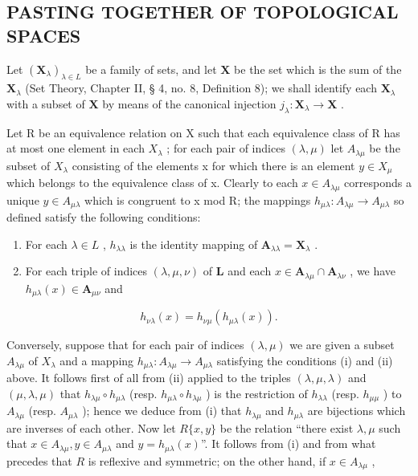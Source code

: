 \subsection{PASTING TOGETHER OF TOPOLOGICAL SPACES}

Let \((\mathbf{X}_{\lambda})_{\lambda \in L}\) be a family of sets, and let \(\mathbf{X}\) be the set which is the sum of the \(\mathbf{X}_{\lambda}\) (Set Theory, Chapter II, § 4, no. 8, Definition 8); we shall identify each \(\mathbf{X}_{\lambda}\) with a subset of \(\mathbf{X}\) by means of the canonical injection \(j_{\lambda}: \mathbf{X}_{\lambda} \to \mathbf{X}\) .

Let R be an equivalence relation on X such that each equivalence class of R has at most one element in each \(X_{\lambda}\) ; for each pair of indices \((\lambda, \mu)\) let \(A_{\lambda\mu}\) be the subset of \(X_{\lambda}\) consisting of the elements x for which there is an element \(y \in X_{\mu}\) which belongs to the equivalence class of x. Clearly to each \(x \in A_{\lambda\mu}\) corresponds a unique \(y \in A_{\mu\lambda}\) which is congruent to x mod R; the mappings \(h_{\mu\lambda}: A_{\lambda\mu} \to A_{\mu\lambda}\) so defined satisfy the following conditions:

\begin{enumerate}
\def\labelenumi{(\roman{enumi})}
\item
  For each \(\lambda \in L\) , \(h_{\lambda \lambda}\) is the identity mapping of \(\mathbf{A}_{\lambda \lambda} = \mathbf{X}_{\lambda}\) .
\item
  For each triple of indices \((\lambda, \mu, \nu)\) of \(\mathbf{L}\) and each \(x \in \mathbf{A}_{\lambda \mu} \cap \mathbf{A}_{\lambda \nu}\) , we have \(h_{\mu \lambda}(x) \in \mathbf{A}_{\mu \nu}\) and
\end{enumerate}

\[
h _ {\nu \lambda} (x) = h _ {\nu \mu} (h _ {\mu \lambda} (x)).\tag{1}
\]

Conversely, suppose that for each pair of indices \((\lambda, \mu)\) we are given a subset \(A_{\lambda \mu}\) of \(X_{\lambda}\) and a mapping \(h_{\mu \lambda}: A_{\lambda \mu} \to A_{\mu \lambda}\) satisfying the conditions (i) and (ii) above. It follows first of all from (ii) applied to the triples \((\lambda, \mu, \lambda)\) and \((\mu, \lambda, \mu)\) that \(h_{\lambda \mu} \circ h_{\mu \lambda}\) (resp. \(h_{\mu \lambda} \circ h_{\lambda \mu}\) ) is the restriction of \(h_{\lambda \lambda}\) (resp. \(h_{\mu \mu}\) ) to \(A_{\lambda \mu}\) (resp. \(A_{\mu \lambda}\) ); hence we deduce from (i) that \(h_{\lambda \mu}\) and \(h_{\mu \lambda}\) are bijections which are inverses of each other. Now let \(R\{x, y\}\) be the relation ``there exist \(\lambda, \mu\) such that \(x \in A_{\lambda \mu}, y \in A_{\mu \lambda}\) and \(y = h_{\mu \lambda}(x)\)''. It follows from (i) and from what precedes that \(R\) is reflexive and symmetric; on the other hand, if \(x \in A_{\lambda \mu}\) ,

